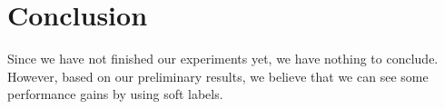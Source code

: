 \section{Conclusion}

Since we have not finished our experiments yet, we have nothing to conclude.
However, based on our preliminary results, we believe that we can see some
performance gains by using soft labels.
